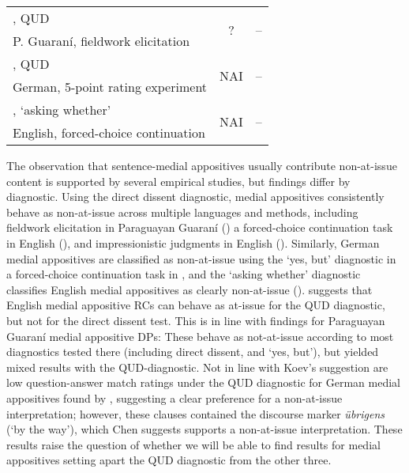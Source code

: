 \documentclass[times,linguex,xcolor]{glossa}
\begin{document}
\begin{table}[ht]
\begin{tabular}{l c c}
      \citealt{tonhauser_diagnosing_2012}, QUD     & \multirow{2}{*}{?}
                                                    & \multirow{2}{*}{--} \\ 
      \scriptsize P. Guaraní, fieldwork elicitation  &  \\ \midrule

      \citealt{chen_presuppositions_2024}, QUD     & \multirow{2}{*}{NAI}
                                                    & \multirow{2}{*}{--} \\ 
      \scriptsize German, 5-point rating experiment  &  \\ \midrule\midrule

      \citealt{tonhauser_how_2018}, `asking whether'    & \multirow{2}{*}{NAI}
                                                    & \multirow{2}{*}{--} \\ 
      \scriptsize English, forced-choice continuation  &  \\ \bottomrule

  \end{tabular}
  \end{table}

  The observation that sentence-medial appositives usually contribute non-at-issue content is supported by several empirical studies, but findings differ by diagnostic.
  Using the direct dissent diagnostic, medial appositives consistently behave as non-at-issue across multiple languages and methods, including fieldwork elicitation in Paraguayan Guaraní (\citealt{tonhauser_diagnosing_2012}) a forced-choice continuation task in English (\citealt{syrett_experimental_2015}), and impressionistic judgments in English (\citealt{potts_logic_2005,amaral_review_2007}). Similarly, German medial appositives are classified as non-at-issue using the `yes, but' diagnostic in a forced-choice continuation task in \citealt{destruel_cross-linguistic_2015}, and the `asking whether' diagnostic classifies English medial appositives as clearly non-at-issue (\citealt{tonhauser_how_2018,solstad_cataphoric_2024}).
  \citealt{koev_notions_2018} suggests that English medial appositive RCs can behave as at-issue for the QUD diagnostic, but not for the direct dissent test. This is in line with  findings for Paraguayan Guaraní medial appositive DPs: These behave as not-at-issue according to most diagnostics tested there (including direct dissent, and `yes, but'), but yielded mixed results with the QUD-diagnostic. Not in line with Koev's suggestion are low question-answer match ratings under the QUD diagnostic for German medial appositives found by \citet{chen_presuppositions_2024}, suggesting a clear preference for a non-at-issue interpretation; however, these clauses contained the discourse marker \emph{übrigens} (‘by the way’), which Chen suggests supports a non-at-issue interpretation. These results raise the question of whether we will be able to find results for medial appositives setting apart the QUD diagnostic from the other three.
\end{document}
